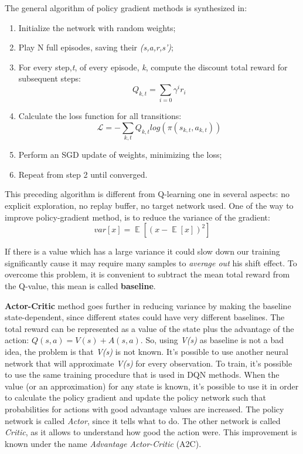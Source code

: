 \documentclass[12pt]{article}
\DeclareMathOperator{\EX}{\mathbb{E}}%
\begin{document}
The general algorithm of policy gradient methods is synthesized in:
\begin{enumerate}
    \item Initialize the network with random weights;
    \item Play N full episodes, saving their \textit{(s,a,r,s')};
    \item For every step,\textit{t}, of every episode, \textit{k}, compute the discount total reward for subsequent steps: \[ Q_{k,t} = \sum_{i=0} \gamma^i r_i      \]
    \item  Calculate the loss function for all transitions: \[ \mathcal{L}= -\sum_{k,t} Q_{k,t} log( \pi(s_{k,t}, a_{k,t}))\]
    \item Perform an SGD update of weights, minimizing the loss;
    \item Repeat from step 2 until converged.
\end{enumerate}

This preceding algorithm is different from Q-learning one in several aspects: no explicit exploration, no replay buffer, no target network used.
One of the way to improve policy-gradient method, is to reduce the variance of the gradient:
\[var[x] = \EX[(x - \EX[x])^2]\]

If there is a value which has a large variance it could slow down our training significantly cause it may require many samples to \textit{average out} his shift effect. To overcome this problem, it is convenient to subtract the mean total reward from the Q-value, this mean is called \textbf{baseline}.

\textbf{Actor-Critic} method goes further in reducing variance by making the baseline state-dependent, since different states could have very different baselines. The total reward can be represented as a value of the state plus the advantage of the action: $Q(s,a)=V(s)+A(s,a)$. So, using \textit{V(s)} as baseline is not a bad idea, the problem is that \textit{V(s)} is not known. It's possible to use another neural network that will approximate \textit{V(s)} for every observation. To train, it's possible to use the same training procedure that is used in DQN methods. 
When the value (or an approximation) for any state is known, it's possible to use it in order to calculate the policy gradient and update the policy network such that probabilities for actions with good advantage values are increased. The policy network is called \textit{Actor}, since it tells what to do. The other network is called \textit{Critic}, as it allows to understand how good the action were. This improvement is known under the name \textit{Advantage Actor-Critic} (A2C). 
\end{document}
